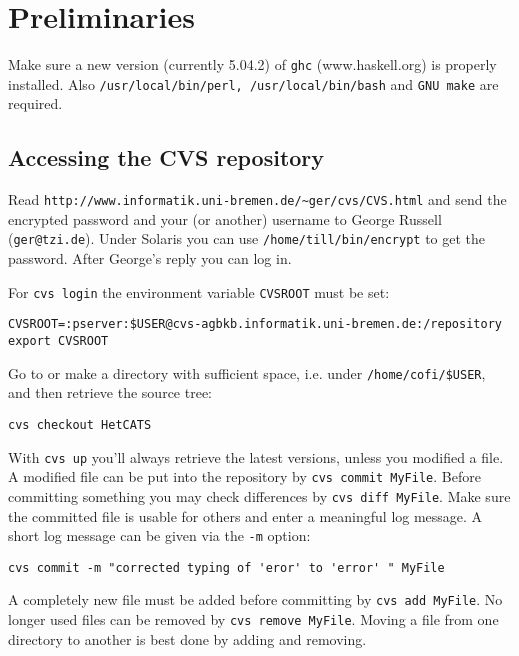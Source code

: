 \documentclass{article}
\begin{document}
\section{Preliminaries}

Make sure a new version (currently 5.04.2) of \texttt{ghc}
(www.haskell.org) is properly installed.  Also
\texttt{/usr/local/bin/perl, /usr/local/bin/bash} and \texttt{GNU
  make} are required.


\subsection{Accessing the CVS repository}

Read \texttt{http://www.informatik.uni-bremen.de/\~{}ger/cvs/CVS.html}
and send the encrypted password and your (or another) username to
George Russell (\texttt{ger@tzi.de}). Under Solaris you can use
\texttt{/home/till/bin/encrypt} to get the password. After George's
reply you can log in. 

For \texttt{cvs login} the environment variable \texttt{CVSROOT} must be set:

\begin{verbatim}
CVSROOT=:pserver:$USER@cvs-agbkb.informatik.uni-bremen.de:/repository
export CVSROOT
\end{verbatim}

Go to or make a directory with sufficient space, i.e. under
\texttt{/home/cofi/\$USER}, and then retrieve the source tree:

\begin{verbatim}
cvs checkout HetCATS
\end{verbatim}

With \texttt{cvs up} you'll always retrieve the latest versions,
unless you modified a file. A modified file can be put into the
repository by \texttt{cvs commit MyFile}. Before committing something
you may check differences by \texttt{cvs diff MyFile}. Make sure the
committed file is usable for others and enter a meaningful log
message. A short log message can be given via the \texttt{-m} option:

\begin{verbatim}
cvs commit -m "corrected typing of 'eror' to 'error' " MyFile
\end{verbatim}

A completely new file must be added before committing by \texttt{cvs
  add MyFile}.  No longer used files can be removed by \texttt{cvs
  remove MyFile}.  Moving a file from one directory to another is
best done by adding and removing.
\end{document}
